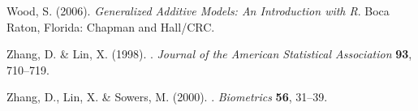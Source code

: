 \documentclass[12pt, notitlepage]{article}
\begin{document}
\begin{thebibliography}{9}
Wood, S. (2006).
\newblock \textit{{Generalized Additive Models: An Introduction with R}}.
\newblock Boca Raton, Florida: Chapman and Hall/CRC.

Zhang, D. \& Lin, X. (1998).
.
\newblock \textit{Journal of the American Statistical Association} \textbf{93}, 710--719.

Zhang, D., Lin, X. \& Sowers, M. (2000).
.
\newblock \textit{Biometrics} \textbf{56}, 31--39.


\end{thebibliography}
\end{document}
